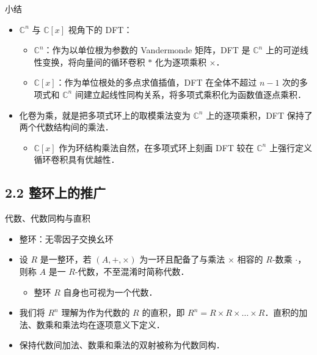 \documentclass[
  ignorenonframetext,
  chinese-hans,
]{beamer}
\providecommand{\tightlist}{%
  \setlength{\itemsep}{0pt}\setlength{\parskip}{0pt}}\usepackage{longtable,booktabs,array}
\theoremstyle{plain}
\theoremstyle{plain}
\theoremstyle{plain}
\theoremstyle{plain}
\theoremstyle{remark}
\begin{document}
\begin{frame}{小结}
\label{ux5c0fux7ed3}
\begin{itemize}
\item
  \(\mathbb C^n\) 与 \(\mathbb C[x]\) 视角下的 DFT：

  \begin{itemize}
  \item
    \(\mathbb C^n\)：作为以单位根为参数的 Vandermonde 矩阵，DFT 是
    \(\mathbb C^n\) 上的可逆线性变换，将向量间的循环卷积 \(*\)
    化为逐项乘积 \(\times\)．
  \item
    \(\mathbb C[x]\)：作为单位根处的多点求值插值，DFT 在全体不超过
    \(n-1\) 次的多项式和 \(\mathbb C^n\)
    间建立起线性同构关系，将多项式乘积化为函数值逐点乘积．
  \end{itemize}
\item
  化卷为乘，就是把多项式环上的取模乘法变为 \(\mathbb C^n\)
  上的逐项乘积，DFT 保持了两个代数结构间的乘法．

  \begin{itemize}
  \tightlist
  \item
    \(\mathbb C[x]\) 作为环结构乘法自然，在多项式环上刻画 DFT 较在
    \(\mathbb C^n\) 上强行定义循环卷积具有优越性．
  \end{itemize}
\end{itemize}
\end{frame}

\subsection{2.2
整环上的推广}\label{ux6574ux73afux4e0aux7684ux63a8ux5e7f}

\begin{frame}{代数、代数同构与直积}
\label{ux4ee3ux6570ux4ee3ux6570ux540cux6784ux4e0eux76f4ux79ef}
\begin{itemize}
\item
  整环：无零因子交换幺环
\item
  设 \(R\) 是一整环，若 \((A,+,\times)\) 为一环且配备了与乘法 \(\times\)
  相容的 \(R\)-数乘 \(\cdot\)，则称 \(A\) 是一
  \(R\)-代数，不至混淆时简称代数．

  \begin{itemize}
  \tightlist
  \item
    整环 \(R\) 自身也可视为一个代数．
  \end{itemize}
\item
  我们将 \(R^n\) 理解为作为代数的 \(R\) 的直积，即
  \(R^n = R \times R \times \dots \times R\)．直积的加法、数乘和乘法均在逐项意义下定义．
\item
  保持代数间加法、数乘和乘法的双射被称为代数同构．
\end{itemize}
\end{frame}
\end{document}
